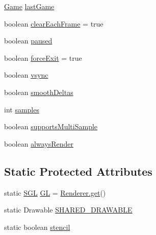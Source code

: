 \begin{DoxyCompactItemize}
\mbox{\hyperlink{interfaceorg_1_1newdawn_1_1slick_1_1_game}{Game}} \mbox{\hyperlink{classorg_1_1newdawn_1_1slick_1_1_game_container_a87a51923caf67c163de08ce0a0295454}{last\+Game}}
\item 
boolean \mbox{\hyperlink{classorg_1_1newdawn_1_1slick_1_1_game_container_acccadaba3a6d02a39d05b73fbe8d6135}{clear\+Each\+Frame}} = true
\item 
boolean \mbox{\hyperlink{classorg_1_1newdawn_1_1slick_1_1_game_container_ae3b73023cf30def1b0b019f6e60dd022}{paused}}
\item 
boolean \mbox{\hyperlink{classorg_1_1newdawn_1_1slick_1_1_game_container_afda255df5a0dc9c1a22e5a169c0176c5}{force\+Exit}} = true
\item 
boolean \mbox{\hyperlink{classorg_1_1newdawn_1_1slick_1_1_game_container_a1a1161c9e75a47325ad0256583fee409}{vsync}}
\item 
boolean \mbox{\hyperlink{classorg_1_1newdawn_1_1slick_1_1_game_container_ae27109ea0f24484683365b54667b2825}{smooth\+Deltas}}
\item 
int \mbox{\hyperlink{classorg_1_1newdawn_1_1slick_1_1_game_container_af37ac6c2d7d33d4fac82860184cafff6}{samples}}
\item 
boolean \mbox{\hyperlink{classorg_1_1newdawn_1_1slick_1_1_game_container_a36ca82978254778d96998ee86c2706bc}{supports\+Multi\+Sample}}
\item 
boolean \mbox{\hyperlink{classorg_1_1newdawn_1_1slick_1_1_game_container_afc21372962046ca458a65fbd22fe4905}{always\+Render}}
\end{DoxyCompactItemize}
\subsection*{Static Protected Attributes}
\begin{DoxyCompactItemize}
\item 
static \mbox{\hyperlink{interfaceorg_1_1newdawn_1_1slick_1_1opengl_1_1renderer_1_1_s_g_l}{S\+GL}} \mbox{\hyperlink{classorg_1_1newdawn_1_1slick_1_1_game_container_a38d69b28b32e0b7e99555b8ae6061289}{GL}} = \mbox{\hyperlink{classorg_1_1newdawn_1_1slick_1_1opengl_1_1renderer_1_1_renderer_abe742c3a7dfca67c6c01821d27087308}{Renderer.\+get}}()
\item 
static Drawable \mbox{\hyperlink{classorg_1_1newdawn_1_1slick_1_1_game_container_ac1844f34fb7c738852219330998424a3}{S\+H\+A\+R\+E\+D\+\_\+\+D\+R\+A\+W\+A\+B\+LE}}
\item 
static boolean \mbox{\hyperlink{classorg_1_1newdawn_1_1slick_1_1_game_container_ad148e9e758ad655dbdc0b9e5fb8b54a0}{stencil}}
\end{DoxyCompactItemize}
